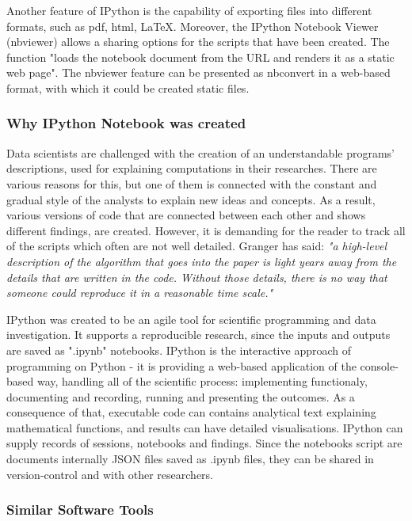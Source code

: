 Another feature of IPython is the capability of exporting files into different formats, such as pdf, html, LaTeX. Moreover, the IPython Notebook Viewer (nbviewer) allows a sharing options for the scripts that have been created. The function "loads the notebook document from the URL and renders it as a static web page".\cite{ipythonDef} The nbviewer feature can be presented as  nbconvert in a web-based format, with which it could be created static files. 

\subsubsection{Why IPython Notebook was created}

Data scientists are challenged with the creation of an understandable programs' descriptions, used for explaining computations in their researches. There are various reasons for this, but one of them is connected with the constant and gradual style of the analysts to explain new ideas and concepts. As a result, various versions of code that are connected between each other and shows different findings, are created. However, it is demanding for the reader to track all of the scripts which often are not well detailed. Granger has said: \textit{"a high-level description of the algorithm that goes into the paper is light years away from
the details that are written in the code. Without those details, there is no way that someone could reproduce it in a reasonable time scale."} \cite{shen2014interactive}

IPython was created to be an agile tool for scientific programming and data investigation. It supports a reproducible research, since the inputs and outputs are saved as ".ipynb" notebooks. IPython is the interactive approach of programming on Python - it is providing a web-based application of the console-based way, handling all of the scientific process: implementing functionaly, documenting and recording, running and presenting the outcomes. As a consequence of that, executable code can contains analytical text explaining mathematical functions, and results can have detailed visualisations. IPython can supply records of sessions, notebooks and findings. Since the notebooks script are documents internally JSON files saved as .ipynb files, they can be shared in version-control and with other researchers. \cite{ipythonFeatures}

\subsubsection{Similar Software Tools}


